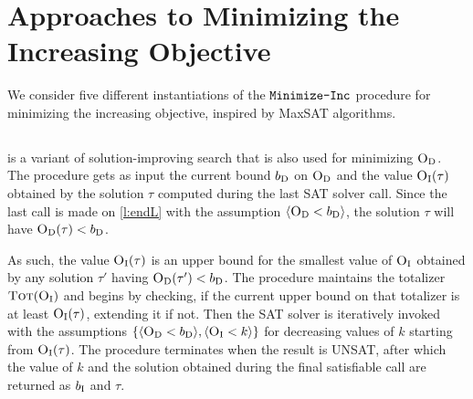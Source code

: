\section{Approaches to Minimizing the Increasing Objective\label{sec:variants}}

We consider five different instantiations of the $\texttt{Minimize-\allowbreak{}Inc}$ procedure for minimizing the increasing objective, inspired by MaxSAT algorithms. 

\subsection{\satunsat{}\label{sec:sat-unsat}}

\satunsat{} is a variant of solution-improving search that is also used for minimizing $\textsc{O}_{\text{D}}$. 
The procedure gets as input the current bound $b_{\text{D}}$ on $\textsc{O}_{\text{D}}$ and the value $\textsc{O}_{\text{I}}(\tau)$ obtained by the solution $\tau$ computed during the last SAT solver call. 
Since the last call is made on \cref{l:endL} with the assumption $\langle \textsc{O}_{\text{D}} < b_{\text{D}} \rangle$, the solution $\tau$ will have $\textsc{O}_{\text{D}}(\tau) < b_{\text{D}}$. 

As such, the value $\textsc{O}_{\text{I}}(\tau)$ is an upper bound for the smallest value of $\textsc{O}_{\text{I}}$ obtained by any solution $\tau'$ having $\textsc{O}_{\text{D}}(\tau') < b_{\text{D}}$.
The procedure \satunsat{} maintains the totalizer $\textsc{Tot}(\textsc{O}_{\text{I}})$ and begins by checking, if the current upper bound on that totalizer is at least $\textsc{O}_{\text{I}}(\tau)$, extending it if not. 
Then the SAT solver is iteratively invoked with the assumptions $\{\langle \textsc{O}_{\text{D}} < b_{\text{D}} \rangle, \langle \textsc{O}_{\text{I}} < k \rangle\}$ for decreasing values of $k$ starting from $\textsc{O}_{\text{I}}(\tau)$.
The procedure terminates when the result is UNSAT, after which the value of $k$ and the solution obtained during the final satisfiable call are returned as $b_{\text{I}}$ and $\tau$.  


